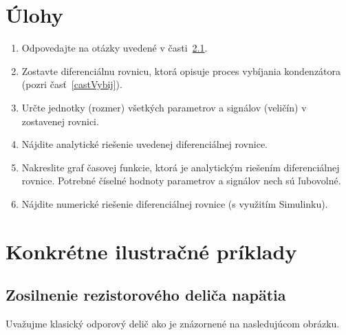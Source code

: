 \documentclass[a4paper, 10pt, ]{article}
\begin{document}
\section{Úlohy}



\begin{enumerate}[leftmargin=0pt, labelsep=4mm, itemsep=0pt]


    \item Odpovedajte na otázky uvedené v časti~\ref{zrdn}.

	\item Zostavte diferenciálnu rovnicu, ktorá opisuje proces vybíjania kondenzátora (pozri časť~\ref{castVybij}).

    \item Určte jednotky (rozmer) všetkých parametrov a signálov (veličín) v zostavenej rovnici.

    \item Nájdite analytické riešenie uvedenej diferenciálnej rovnice.

    \item Nakreslite graf časovej funkcie, ktorá je analytickým riešením diferenciálnej rovnice. Potrebné číselné hodnoty parametrov a signálov nech sú ľubovolné.

    \item Nájdite numerické riešenie diferenciálnej rovnice (s využitím Simulinku).

\end{enumerate}











\section{Konkrétne ilustračné príklady}



\subsection{Zosilnenie rezistorového deliča napätia}
\label{zrdn}


Uvažujme klasický odporový delič ako je znázornené na nasledujúcom obrázku.


\begin{center}
    \centering

    \makebox[\textwidth][c]{%
    
    }

    \label{OdporovyDelic}
\end{center}
\end{document}
